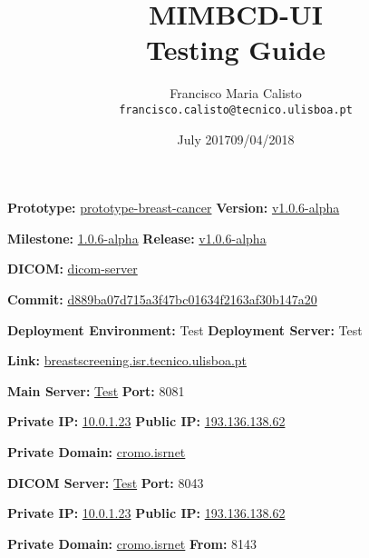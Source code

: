 \documentclass{article}
\title{
MIMBCD-UI
\\
Testing Guide
}
\author{
  Francisco Maria Calisto\\
  \texttt{francisco.calisto@tecnico.ulisboa.pt}
}
\date{July 2017}
\date{09/04/2018}
\begin{document}
\maketitle

\textbf{Prototype:} \hyperlink{https://github.com/MIMBCD-UI/prototype-breast-cancer}{prototype-breast-cancer} \hfill \textbf{Version:} \hyperlink{https://github.com/MIMBCD-UI/prototype-breast-screening/tree/d88150f25a70153444d185c5eb6c6e99f9b6108a}{v1.0.6-alpha}

\textbf{Milestone:} \hyperlink{https://github.com/MIMBCD-UI/prototype-breast-screening/milestone/6}{1.0.6-alpha} \hfill \textbf{Release:} \hyperlink{https://github.com/MIMBCD-UI/prototype-breast-screening/releases/tag/v1.0.6-alpha}{v1.0.6-alpha}

\hfill

\textbf{DICOM:} \hyperlink{https://github.com/MIMBCD-UI/dicom-server}{dicom-server}

\textbf{Commit:} \hyperlink{https://github.com/MIMBCD-UI/dicom-server/tree/d889ba07d715a3f47bc01634f2163af30b147a20}{d889ba07d715a3f47bc01634f2163af30b147a20}

\hfill

\textbf{Deployment Environment:} Test \hfill \textbf{Deployment Server:} Test

\textbf{Link:} \hyperlink{breastscreening.isr.tecnico.ulisboa.pt}{breastscreening.isr.tecnico.ulisboa.pt}

\hfill

\textbf{Main Server:} \hyperlink{http://breastscreening.isr.tecnico.ulisboa.pt:8081/src/public/index.html}{Test} \hfill \textbf{Port:} 8081

\textbf{Private IP:} \hyperlink{http://10.0.1.23:8081/src/public/index.html}{10.0.1.23} \hfill \textbf{Public IP:} \hyperlink{http://193.136.138.62:8081/src/public/index.html}{193.136.138.62}

\textbf{Private Domain:} \hyperlink{http://cromo.isrnet:8081/src/public/index.html}{cromo.isrnet}

\hfill

\textbf{DICOM Server:} \hyperlink{http://breastscreening.isr.tecnico.ulisboa.pt:8043/app/explorer.html}{Test} \hfill \textbf{Port:} 8043

\textbf{Private IP:} \hyperlink{http://10.0.1.23:8043/app/explorer.html}{10.0.1.23} \hfill \textbf{Public IP:} \hyperlink{http://193.136.138.62:8043/app/explorer.html}{193.136.138.62}

\textbf{Private Domain:} \hyperlink{http://cromo.isrnet:8043/app/explorer.html}{cromo.isrnet} \hfill \textbf{From:} 8143

\clearpage









\clearpage



\end{document}
